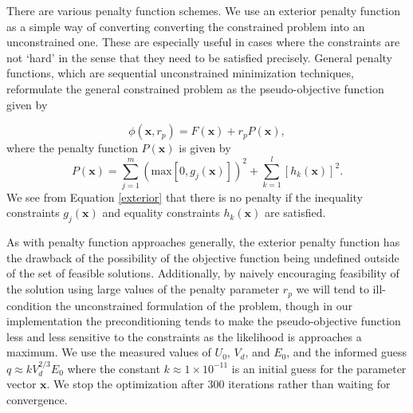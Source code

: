 \documentclass[12pt,a4paper,oneside]{book}
\begin{document}
There are various penalty function schemes. We use an exterior penalty function as a simple way of converting converting the constrained problem into an unconstrained one. These are especially useful in cases where the constraints are not `hard' in the sense that they need to be satisfied precisely. General penalty functions, which are sequential unconstrained minimization techniques, reformulate the general constrained problem as the pseudo-objective function given by

\[ \phi(\mathbf{x}, r_p ) = F(\mathbf{x}) + r_p P(\mathbf{x}), \]
where the penalty function $P \left( \mathbf{x} \right)$ is given by
\begin{equation} \label{exterior}
 P( \mathbf{x} ) = \sum_{j = 1}^m \left( \mbox{max} \left[ 0, g_j(\mathbf{x} ) \right] \right)^2 + 
\sum_{k = 1}^l \left[ h_k( \mathbf{x}) \right]^2 .
\end{equation}
We see from Equation \ref{exterior} that there is no penalty if the inequality constraints $g_j(\mathbf{x})$ and equality constraints $h_k(\mathbf{x})$ are satisfied.
 
As with penalty function approaches generally, the exterior penalty function has the drawback of the possibility of the objective function being undefined outside of the set of feasible solutions. Additionally, by naively encouraging feasibility of the solution using large values of the penalty parameter $r_p$ we will tend to ill-condition the unconstrained formulation of the problem, though in our implementation the preconditioning tends to make the pseudo-objective function less and less sensitive to the constraints as the likelihood is approaches a maximum. We use the measured values of $U_0$, $V_d$, and $E_0$, and the informed guess $q \approx k V_d^{2/3} E_0$ where the constant $k \approx 1 \times 10^{-11}$ is an initial guess for the parameter vector $\mathbf{x}$. We stop the optimization after 300 iterations rather than waiting for convergence.
\end{document}
